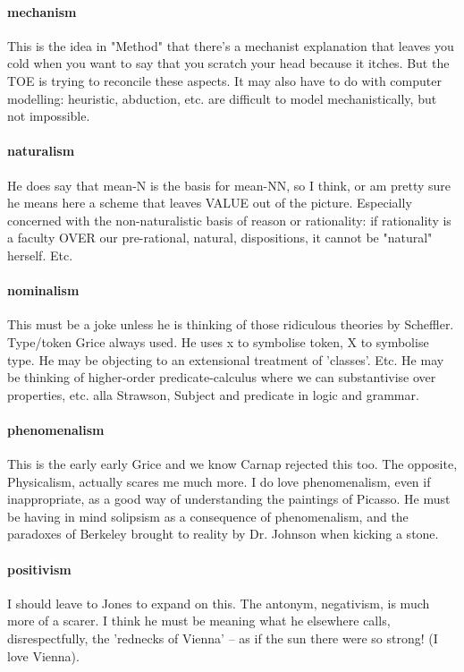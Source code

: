 \documentclass[10pt,titlepage]{book}
\begin{document}
\paragraph{mechanism}
This is the idea in "Method" that there's a mechanist  
explanation that leaves you cold when you want to say that you scratch your head  
because it itches. But the TOE is trying to reconcile these aspects. It may 
also  have to do with computer modelling: heuristic, abduction, etc. are 
difficult to  model mechanistically, but not impossible.
 
\paragraph{naturalism}
He does say that mean-N is the basis for mean-NN, so I think,  
or am pretty sure he means here a scheme that leaves VALUE out of the 
picture.  Especially concerned with the non-naturalistic basis of reason or 
rationality:  if rationality is a faculty OVER our pre-rational, natural, 
dispositions, it  cannot be "natural" herself. Etc.
 
\paragraph{nominalism}
This must be a joke unless he is thinking of those ridiculous  
theories by Scheffler. Type/token Grice always used. He uses x to symbolise  
token, X to symbolise type. He may be objecting to an extensional treatment 
of  'classes'. Etc. He may be thinking of higher-order predicate-calculus 
where we  can substantivise over properties, etc. alla Strawson, Subject and 
predicate in  logic and grammar.
 
\paragraph{phenomenalism}
This is the early early Grice and we know Carnap rejected  
this too. The opposite, Physicalism, actually scares me much more. I do love  
phenomenalism, even if inappropriate, as a good way of understanding the  
paintings of Picasso. He must be having in mind solipsism as a consequence of 
 phenomenalism, and the paradoxes of Berkeley brought to reality by Dr. 
Johnson  when kicking a stone.

\paragraph{positivism}
I should leave to Jones to expand on this. The antonym,  
negativism, is much more of a scarer. I think he must be meaning what he  
elsewhere calls, disrespectfully, the 'rednecks of Vienna' -- as if the sun  there 
were so strong! (I love Vienna).
 
\end{document}
